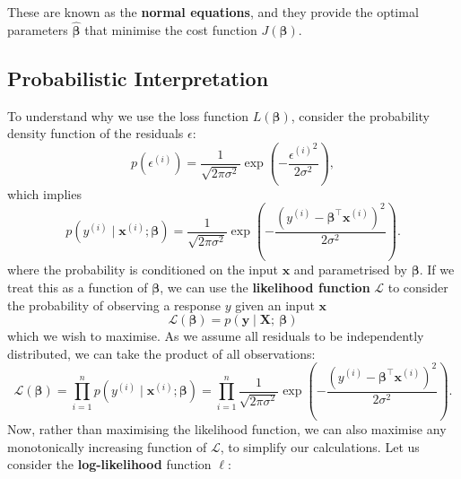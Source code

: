 \documentclass{article}
\begin{document}
These are known as the \textbf{normal equations}, and they provide the
optimal parameters \(\hat{\symbf{\beta}}\) that minimise the cost
function \(J\left( \symbf{\beta} \right)\).
\subsection{Probabilistic Interpretation}\label{section:linear-regression-probabilistic-interpretation}
To understand why we use the loss function \(L\left( \symbf{\beta}
\right)\), consider the probability density function of the residuals
\(\epsilon\):
\begin{equation*}
    p\left( \epsilon^{\left( i \right)} \right) = \frac{1}{\sqrt{2 \pi \sigma^2}} \exp\left( -\frac{{\epsilon^{\left( i \right)}}^2}{2 \sigma^2} \right),
\end{equation*}
which implies
\begin{equation*}
    p\left( y^{\left( i \right)} \mid \symbf{x}^{\left( i \right)}; \symbf{\beta} \right) = \frac{1}{\sqrt{2 \pi \sigma^2}} \exp\left( -\frac{{\left( y^{\left( i \right)} - \symbf{\beta}^\top \symbf{x}^{\left( i \right)} \right)}^2}{2 \sigma^2} \right).
\end{equation*}
where the probability is conditioned on the input \(\symbf{x}\) and
parametrised by \(\symbf{\beta}\). If we treat this as a function of
\(\symbf{\beta}\), we can use the \textbf{likelihood function} \(\mathcal{L}\) to
consider the probability of observing a response \(y\) given an input
\(\symbf{x}\)
\begin{equation*}
    \mathcal{L}\left( \symbf{\beta} \right) = p\left( \symbf{y} \mid \symbf{X} ;\: \symbf{\beta} \right)
\end{equation*}
which we wish to maximise. As we assume all residuals to be
independently distributed, we can take the product of all observations:
\begin{equation*}
    \mathcal{L}\left( \symbf{\beta} \right) = \prod_{i = 1}^n p\left( y^{\left( i \right)} \mid \symbf{x}^{\left( i \right)}; \symbf{\beta} \right) = \prod_{i = 1}^n \frac{1}{\sqrt{2 \pi \sigma^2}} \exp\left( -\frac{{\left( y^{\left( i \right)} - \symbf{\beta}^\top \symbf{x}^{\left( i \right)} \right)}^2}{2 \sigma^2} \right).
\end{equation*}
Now, rather than maximising the likelihood function, we can also
maximise any monotonically increasing function of \(\mathcal{L}\), to simplify
our calculations. Let us consider the \textbf{log-likelihood} function
\(\ell\):
\end{document}
